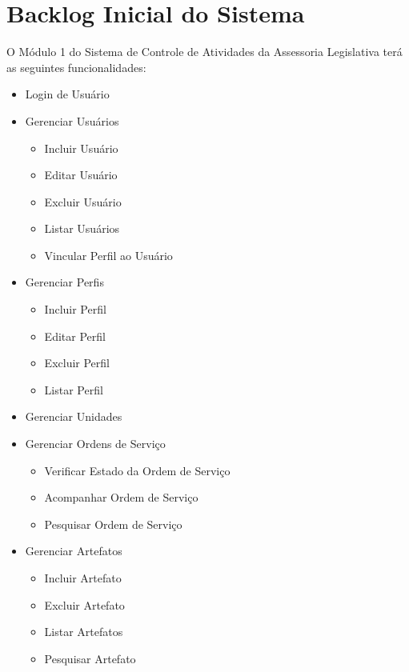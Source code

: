 \chapter{Backlog Inicial do Sistema}

O Módulo 1 do Sistema de Controle de Atividades da Assessoria Legislativa terá as seguintes funcionalidades:

\begin{itemize}
	\item Login de Usuário
	
	\item Gerenciar Usuários
	
	\begin{itemize}
		\item Incluir Usuário
		\item Editar Usuário
		\item Excluir Usuário
		\item Listar Usuários
		\item Vincular Perfil ao Usuário		
	\end{itemize}

	\item Gerenciar Perfis
	
	\begin{itemize}
		\item Incluir Perfil
		\item Editar Perfil
		\item Excluir Perfil
		\item Listar Perfil
	\end{itemize}	

	\item Gerenciar Unidades	


	\item Gerenciar Ordens de Serviço
	
	\begin{itemize}
		\item Verificar Estado da Ordem de Serviço
		\item Acompanhar Ordem de Serviço
		\item Pesquisar Ordem de Serviço
	\end{itemize}	
	
	\item Gerenciar Artefatos

	\begin{itemize}
		\item Incluir Artefato
		\item Excluir Artefato
		\item Listar Artefatos
		\item Pesquisar Artefato
	\end{itemize}	


\end{itemize}
